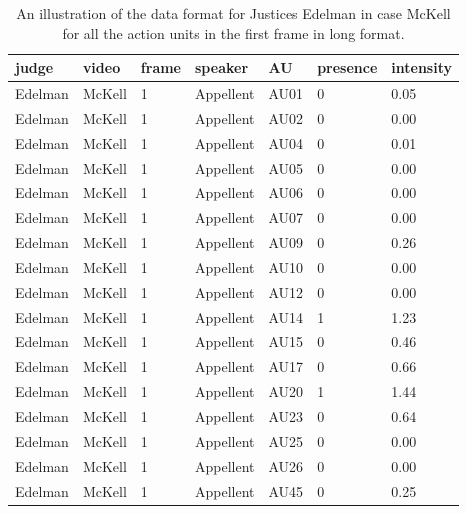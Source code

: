 \documentclass{monashthesis}
\begin{document}
\begin{table}[ht]
\begin{center}
\caption{\label{tab:long} An illustration of the data format for Justices Edelman in case McKell for all the action units in the first frame in long format.}
\begin{tabular}{lllllll}
\toprule
judge & video & frame & speaker & AU & presence & intensity \\
\midrule
Edelman & McKell & 1 & Appellent & AU01 & 0 & 0.05 \\
Edelman & McKell & 1 & Appellent & AU02 & 0 & 0.00 \\
Edelman & McKell & 1 & Appellent & AU04 & 0 & 0.01 \\
Edelman & McKell & 1 & Appellent & AU05 & 0 & 0.00 \\
Edelman & McKell & 1 & Appellent & AU06 & 0 & 0.00 \\
Edelman & McKell & 1 & Appellent & AU07 & 0 & 0.00 \\
Edelman & McKell & 1 & Appellent & AU09 & 0 & 0.26 \\
Edelman & McKell & 1 & Appellent & AU10 & 0 & 0.00 \\
Edelman & McKell & 1 & Appellent & AU12 & 0 & 0.00 \\
Edelman & McKell & 1 & Appellent & AU14 & 1 & 1.23 \\
Edelman & McKell & 1 & Appellent & AU15 & 0 & 0.46 \\
Edelman & McKell & 1 & Appellent & AU17 & 0 & 0.66 \\
Edelman & McKell & 1 & Appellent & AU20 & 1 & 1.44 \\
Edelman & McKell & 1 & Appellent & AU23 & 0 & 0.64 \\
Edelman & McKell & 1 & Appellent & AU25 & 0 & 0.00 \\
Edelman & McKell & 1 & Appellent & AU26 & 0 & 0.00 \\
Edelman & McKell & 1 & Appellent & AU45 & 0 & 0.25 \\
\bottomrule
\end{tabular}
\end{center}
\end{table}
\end{document}
